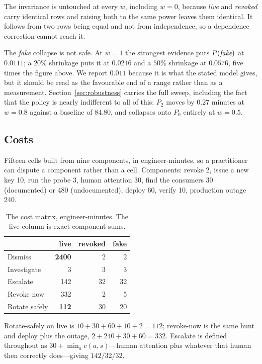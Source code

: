 \documentclass{article}
\begin{document}
The invariance is untouched at every $w$, including $w = 0$, because
\emph{live} and \emph{revoked} carry identical rows and raising both to the same
power leaves them identical. It follows from two rows being equal and not from
independence, so a dependence correction cannot reach it.

The \emph{fake} collapse is not safe. At $w = 1$ the strongest evidence puts
$P(\emph{fake})$ at $0.0111$; a $20\%$ shrinkage puts it at $0.0216$ and a $50\%$
shrinkage at $0.0576$, five times the figure above. We report $0.011$ because it
is what the stated model gives, but it should be read as the favourable end of a
range rather than as a measurement. Section~\ref{sec:robustness} carries the
full sweep, including the fact that the policy is nearly indifferent to all of
this: $P_2$ moves by $0.27$ minutes at $w = 0.8$ against a baseline of $84.80$,
and collapses onto $P_0$ entirely at $w = 0.5$.

\subsection{Costs}

Fifteen cells built from nine components, in engineer-minutes, so a practitioner
can dispute a component rather than a cell. Components: revoke 2, issue a new
key 10, run the probe 3, human attention 30, find the consumers 30 (documented)
or 480 (undocumented), deploy 60, verify 10, production outage 240.

\begin{table}[t]
\centering
\begin{tabular}{lrrr}
\toprule
& \textbf{live} & \textbf{revoked} & \textbf{fake} \\
\midrule
Dismiss & \textbf{2400} & 2 & 2 \\
Investigate & 3 & 3 & 3 \\
Escalate & 142 & 32 & 32 \\
Revoke now & 332 & 2 & 5 \\
Rotate safely & \textbf{112} & 30 & 20 \\
\bottomrule
\end{tabular}
\caption{The cost matrix, engineer-minutes. The live column is exact component
sums.}
\label{tab:costs}
\end{table}

Rotate-safely on live is $10+30+60+10+2 = 112$; revoke-now is the same hunt and
deploy plus the outage, $2+240+30+60 = 332$. Escalate is defined throughout as
$30 + \min_a c(a,s)$---human attention plus whatever that human then correctly
does---giving $142/32/32$.
\end{document}
